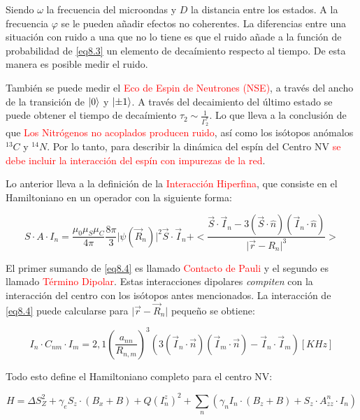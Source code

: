 \documentclass{book}
\begin{document}
Siendo  $\omega$ la frecuencia del microondas y $D$ la distancia entre los estados. A la frecuencia $\varphi$ se le pueden añadir efectos no coherentes. La diferencias entre una situación con ruido a una que no lo tiene es que el ruido añade a la función de probabilidad de \ref{eq8.3} un elemento de decaímiento respecto al tiempo. De esta manera es posible medir el ruido.

También se puede medir el \textcolor{red}{Eco de Espin de Neutrones (NSE)}, a través del ancho de la transición de $\ket{0}$ y $\ket{\pm 1}$. A través del decaimiento del último estado se puede obtener el tiempo de decaímiento $\tau_2 \sim \frac{1}{\Gamma_2^*}$. Lo que lleva a la conclusión de que \textcolor{red}{Los Nitrógenos no acoplados producen ruido}, así como los isótopos anómalos ${}^{13}C$ y ${}^{14}N$. Por lo tanto, para describir la dinámica del espín del Centro NV \textcolor{red}{se debe incluir la interacción del espín con impurezas de la red}.

Lo anterior lleva a la definición de  la \textcolor{red}{Interacción Hiperfina}, que consiste en el Hamiltoniano en un operador con la siguiente forma:

\begin{equation}\label{eq8.4}S\cdot A\cdot I_n=\frac{\mu_0\mu_S\mu_C}{4\pi}\frac{8\pi}{3}\lvert\psi(\vec{R}_n)\rvert^2\vec{S}\cdot\vec{I}_n +<\frac{\vec{S}\cdot\vec{I}_n-3(\vec{S}\cdot\hat{n})(\vec{I}_n\cdot \hat{n})}{\lvert \vec{r}-{R}_n\rvert^3}>\end{equation}

El primer sumando de \ref{eq8.4} es llamado \textcolor{red}{Contacto de Pauli} y el segundo es llamado \textcolor{red}{Término Dipolar}. Estas interacciones dipolares \textit{compiten} con la interacción del centro con los isótopos antes mencionados. La interacción de \ref{eq8.4} puede calcularse para $\lvert\vec{r}-\vec{R}_n\rvert$ pequeño se obtiene:

 \begin{equation}\label{eq8.5}I_n\cdot C_{nm}\cdot I_m=2,1(\frac{a_{nn}}{R_{n,m}})^3(3(\vec{I}_n\cdot\vec{n})(\vec{I}_m\cdot\vec{n})-\vec{I}_n\cdot\vec{I}_m) [KHz]\end{equation}
 
 Todo esto define el Hamiltoniano completo para el centro NV:
 
\begin{equation}\label{eq8.6}H=\Delta S_Z^2+\gamma_e S_z\cdot(B_x+B)+Q(I_n^z)^2 +\sum_n(\gamma_n I_n\cdot(B_z+B)+S_z\cdot A_{zz}^n \cdot I_n)\end{equation}
\end{document}
